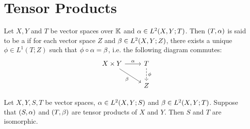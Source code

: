 \documentclass{book}
\begin{document}
 
 
 
 
 
 
 
 
 
 
 
 
 
 
 
 
 
 
 
 
 
 
 
 
 
 
 
 
 
 
 
 
 
 
 
 
 
 
 
 
 
 \newpage
 \section{Tensor Products}
 
 \begin{defn}
 	Let $X, Y$ and $T$ be vector spaces over $\mathbb{K}$ and $\alpha \in L^2(X, Y; T)$. Then $(T, \alpha)$ is said to be a  if for each vector space $Z$ and $\beta \in L^2(X, Y; Z)$, there exists a unique $\phi \in L^1(T;Z)$ such that $\phi \circ \alpha = \beta$, i.e. the following diagram commutes:
 	\[ 
 	\begin{tikzcd}
 		X \times Y \arrow[r, "\al"] \arrow[dr, "\be"'] 	
 		& T  \arrow[d, dashed, "\phi"] \\
 		& Z 
 	\end{tikzcd}
 	\] 
 \end{defn}
 
 \begin{ex}
 	Let $X, Y, S, T$ be vector spaces, $\alpha \in L^2(X, Y; S)$ and $\beta \in L^2(X, Y; T)$. Suppose that $(S, \alpha)$ and $(T, \beta)$ are tensor products of $X$ and $Y$. Then $S$ and $T$ are isomorphic. 
 \end{ex}
 
\end{document}
